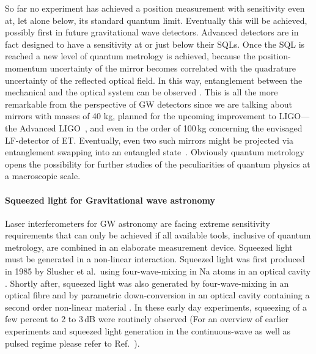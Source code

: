 So far no experiment has achieved a position measurement with
sensitivity even at, let alone below, its standard quantum limit.
Eventually this will be achieved, possibly first in future
gravitational wave detectors.  Advanced detectors are in
fact designed to have a sensitivity at or just below their SQLs.
Once the SQL is reached a new level of quantum metrology is achieved, because the position-momentum
uncertainty of the mirror becomes correlated with the quadrature
uncertainty of the reflected optical field. In this way, entanglement
between the mechanical and the optical system can be observed
\cite{Vitali2007}. This is all the more remarkable from the perspective of GW detectors
since we are talking about mirrors with masses of 40 kg, planned for
the upcoming improvement to LIGO---the Advanced LIGO~\cite{aLIGO}, and even in the order of 100\,kg concerning the envisaged LF-detector of ET.
Eventually, even two such mirrors might be projected via entanglement swapping
\cite{Pirandola2006} into an entangled state~\cite{M-Ebhardt2008}.
Obviously quantum metrology opens the possibility for further
studies of the peculiarities of quantum physics at a macroscopic scale.



\FloatBarrier
\paragraph{Squeezed light for Gravitational wave astronomy}\label{subsec:SQZforGWD}

Laser interferometers for GW astronomy are facing extreme sensitivity requirements that can only be achieved if all available
tools, inclusive of quantum metrology, are combined in an elaborate measurement device.  Squeezed light must be generated in a non-linear
interaction. Squeezed light was first produced in 1985 by
Slusher et al.\ using four-wave-mixing in Na atoms in an optical
cavity \cite{Slusher1985}. Shortly after, squeezed light was also
generated by four-wave-mixing in an optical fibre \cite{Shelby1986}
and by parametric down-conversion in an optical cavity containing a
second order non-linear material \cite{Wu1986}. In these early day
experiments, squeezing of a few percent to 2  to 3\,dB were routinely observed (For an
overview of earlier experiments and squeezed light generation in
the continuous-wave as well as pulsed regime please refer to Ref.~\cite{BachorRalph2004}).


